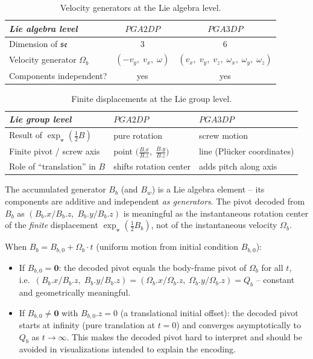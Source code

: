 \begin{table}[!h]
\centering\small
\begin{tabular}{l|c|c}
\hline
\emph{Lie algebra level} & $PGA2DP$ & $PGA3DP$ \\
\hline
Dimension of $\mathfrak{se}$ & $3$ & $6$ \\
Velocity generator $\Omega_b$ & $(-v_y,\; v_x,\; \omega)$ & $(v_x,\; v_y,\; v_z,\;
\omega_x,\; \omega_y,\; \omega_z)$ \\
Components independent? & yes & yes \\
\hline
\end{tabular}
\caption{Velocity generators at the Lie algebra level.}
\label{tab:lie_algebra_level}
\end{table}

\begin{table}[!h]
\centering\small
\begin{tabular}{p{3.6cm}|p{4.3cm}|p{4.3cm}}
\hline
\emph{Lie group level} & $PGA2DP$ & $PGA3DP$ \\
\hline
Result of $\exp_{\veedot}(\tfrac{1}{2}B)$ & pure rotation & screw motion \\
Finite pivot / screw axis & point $\bigl(\tfrac{B.x}{B.z},\;\tfrac{B.y}{B.z}\bigr)$ & line
(Pl\"{u}cker coordinates) \\
Role of ``translation'' in $B$ & shifts rotation center & adds pitch along axis \\
\hline
\end{tabular}
\caption{Finite displacements at the Lie group level.}
\label{tab:exp_map_2d_vs_3d}
\end{table}

The accumulated generator $B_b$ (and $B_w$) is a Lie algebra element -- its components are
additive and independent \emph{as generators}. The pivot decoded from $B_b$ as
$(B_b.x/B_b.z,\; B_b.y/B_b.z)$ is meaningful as the instantaneous rotation center of the
\emph{finite} displacement $\exp_{\veedot}(\tfrac{1}{2} B_b)$, not of the instantaneous
velocity $\Omega_b$.

When $B_b = B_{b,0} + \Omega_b \cdot t$ (uniform motion from initial condition $B_{b,0}$):

\begin{itemize}
    \item If $B_{b,0} = \mathbf{0}$: the decoded pivot equals the body-frame pivot of
    $\Omega_b$ for all $t$, i.e.\
    $(B_b.x/B_b.z,\; B_b.y/B_b.z) = (\Omega_b.x/\Omega_b.z,\; \Omega_b.y/\Omega_b.z)
    = Q_b$ -- constant and geometrically meaningful.

    \item If $B_{b,0} \neq \mathbf{0}$ with $B_{b,0}.z = 0$ (a translational initial
    offset): the decoded pivot starts at infinity (pure translation at $t=0$) and
    converges asymptotically to $Q_b$ as $t \to \infty$. This makes the decoded pivot hard
    to interpret and should be avoided in visualizations intended to explain the encoding.
\end{itemize}


